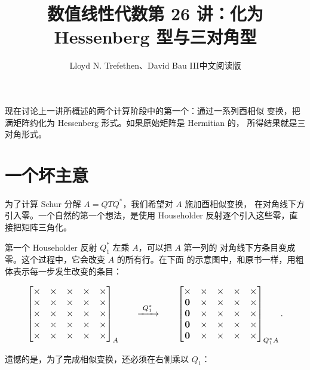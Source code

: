 \documentclass[UTF8,fontset=none,12pt]{ctexart}
\title{数值线性代数\quad 第 26 讲：化为 Hessenberg 型与三对角型}
\author{Lloyd N. Trefethen、David Bau III\quad 中文阅读版}
\date{}
\begin{document}
\maketitle
\pagestyle{plain}

现在讨论上一讲所概述的两个计算阶段中的第一个：通过一系列酉相似
变换，把满矩阵约化为 Hessenberg 形式。如果原始矩阵是 Hermitian 的，
所得结果就是三对角形式。

\section*{一个坏主意}

为了计算 Schur 分解 $A=QTQ^*$，我们希望对 $A$ 施加酉相似变换，
在对角线下方引入零。一个自然的第一个想法，是使用 Householder
反射逐个引入这些零，直接把矩阵三角化。

第一个 Householder 反射 $Q_1^*$ 左乘 $A$，可以把 $A$ 第一列的
对角线下方条目变成零。这个过程中，它会改变 $A$ 的所有行。在下面
的示意图中，和原书一样，用粗体表示每一步发生改变的条目：

\[
\resizebox{0.92\textwidth}{!}{$
\begin{array}{c@{\qquad\xrightarrow{\ Q_1^*\ } \qquad}c}
\begin{bmatrix}
\times&\times&\times&\times&\times\\
\times&\times&\times&\times&\times\\
\times&\times&\times&\times&\times\\
\times&\times&\times&\times&\times\\
\times&\times&\times&\times&\times
\end{bmatrix}_{A}
&
\begin{bmatrix}
\mathbf{\times}&\mathbf{\times}&\mathbf{\times}&\mathbf{\times}&\mathbf{\times}\\
\mathbf{0}&\mathbf{\times}&\mathbf{\times}&\mathbf{\times}&\mathbf{\times}\\
\mathbf{0}&\mathbf{\times}&\mathbf{\times}&\mathbf{\times}&\mathbf{\times}\\
\mathbf{0}&\mathbf{\times}&\mathbf{\times}&\mathbf{\times}&\mathbf{\times}\\
\mathbf{0}&\mathbf{\times}&\mathbf{\times}&\mathbf{\times}&\mathbf{\times}
\end{bmatrix}_{Q_1^*A}.
\end{array}$}
\]

遗憾的是，为了完成相似变换，还必须在右侧乘以 $Q_1$：
\end{document}
